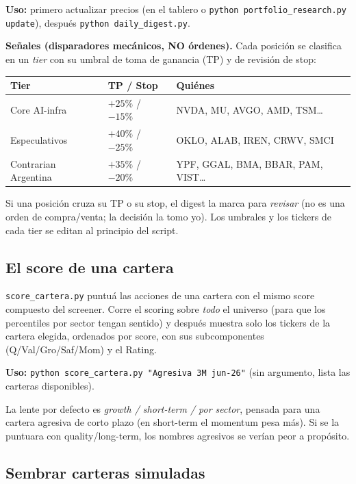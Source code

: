 \documentclass[11pt,a4paper]{article}
\newcommand{\code}[1]{\texttt{#1}}
\newcommand{\fpath}[1]{\texttt{#1}}
\begin{document}
\noindent\textbf{Uso:} primero actualizar precios (en el tablero o
\code{python portfolio\_research.py update}), despu\'es \code{python daily\_digest.py}.

\noindent\textbf{Se\~nales (disparadores mec\'anicos, NO \'ordenes).} Cada posici\'on se
clasifica en un \emph{tier} con su umbral de toma de ganancia (TP) y de revisi\'on de
stop:

\begin{longtable}{L{4.6cm} L{4.2cm} L{4.6cm}}
\toprule
\textbf{Tier} & \textbf{TP / Stop} & \textbf{Qui\'enes} \\
\midrule
\endhead
Core AI-infra & $+25\%$ / $-15\%$ & NVDA, MU, AVGO, AMD, TSM\ldots \\
Especulativos & $+40\%$ / $-25\%$ & OKLO, ALAB, IREN, CRWV, SMCI \\
Contrarian Argentina & $+35\%$ / $-20\%$ & YPF, GGAL, BMA, BBAR, PAM, VIST\ldots \\
\bottomrule
\end{longtable}

\noindent Si una posici\'on cruza su TP o su stop, el digest la marca para
\emph{revisar} (no es una orden de compra/venta; la decisi\'on la tomo yo). Los
umbrales y los tickers de cada tier se editan al principio del script.

\subsection{El score de una cartera}

\fpath{score\_cartera.py} puntu\'a las acciones de una cartera con el mismo score
compuesto del screener. Corre el scoring sobre \emph{todo} el universo (para que los
percentiles por sector tengan sentido) y despu\'es muestra solo los tickers de la
cartera elegida, ordenados por score, con sus subcomponentes (Q/Val/Gro/Saf/Mom) y el
Rating.

\noindent\textbf{Uso:} \code{python score\_cartera.py "Agresiva 3M jun-26"} (sin
argumento, lista las carteras disponibles).

\noindent La lente por defecto es \emph{growth / short-term / por sector}, pensada para
una cartera agresiva de corto plazo (en short-term el momentum pesa m\'as). Si se la
puntuara con quality/long-term, los nombres agresivos se ver\'ian peor a prop\'osito.

\subsection{Sembrar carteras simuladas}
\end{document}
